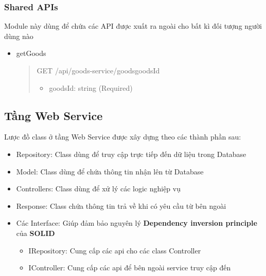 


\subsubsection{Shared APIs}
Module này dùng để chứa các API được xuất ra ngoài cho bất kì đối tượng người dùng nào

\begin{itemize}
	\item getGoods
	      \begin{quote}
		      GET /api/goods-service/goods{goodsId}
		      \begin{itemize}
			      \item goodsId: string (Required)
		      \end{itemize}
	      \end{quote}
\end{itemize}



\subsection{Tầng Web Service}

Lược đồ class ở tầng Web Service được xây dựng theo các thành phần sau:
\begin{itemize}
	\item Repository: Class dùng để truy cập trực tiếp đến dữ liệu trong Database
	\item Model: Class dùng để chứa thông tin nhận lên từ Database
	\item Controllers: Class dùng để xử lý các logic nghiệp vụ
	\item Response: Class chứa thông tin trả về khi có yêu cầu từ bên ngoài
	\item Các Interface: Giúp đảm bảo nguyên lý \textbf{Dependency inversion principle} của \textbf{SOLID}
	      \begin {itemize}
	\item IRepository: Cung cấp các api cho các class Controller
	\item IController: Cung cấp các api để bên ngoài service truy cập đến
\end{itemize}
\end{itemize}

\newpage


